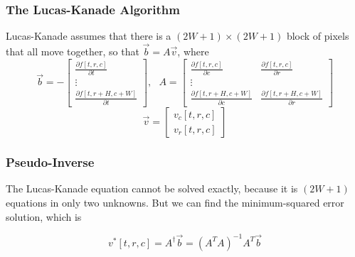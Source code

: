\documentclass{beamer}
\begin{document}
\begin{frame}
  \frametitle{The Lucas-Kanade Algorithm}

  Lucas-Kanade assumes that there is a $(2W+1)\times(2W+1)$ block of
  pixels that all move together, so that $\vec{b}=A\vec{v}$, where
  \[
  \vec{b} = -\left[\begin{array}{c}
      \frac{\partial f[t,r,c]}{\partial t}\\
      \vdots\\
      \frac{\partial f[t,r+H,c+W]}{\partial t}
    \end{array}\right],~~~
  A=\left[\begin{array}{cc}
      \frac{\partial f[t,r,c]}{\partial c}&\frac{\partial f[t,r,c]}{\partial r}\\
      \vdots\\
      \frac{\partial f[t,r+H,c+W]}{\partial c}&\frac{\partial f[t,r+H,c+W]}{\partial r}
    \end{array}\right]
  \]
  \[
  \vec{v}=\left[\begin{array}{c}v_c[t,r,c]\\ v_r[t,r,c]\end{array}\right]
  \]
\end{frame}

\begin{frame}
  \frametitle{Pseudo-Inverse}

  The Lucas-Kanade equation cannot be solved exactly, because it is
  $(2W+1)$ equations in only two unknowns.  But we can find the
  minimum-squared error solution, which is

  \[
  v^*[t,r,c] = A^\dag\vec{b} = (A^TA)^{-1}A^T\vec{b}
  \]
\end{frame}
\end{document}
